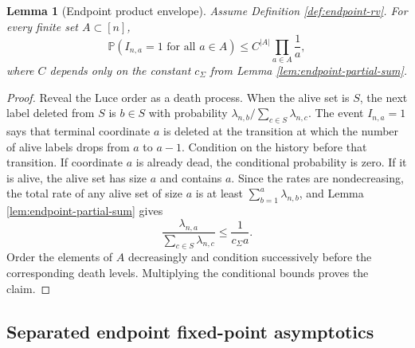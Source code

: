 \documentclass[11pt]{article}
\newtheorem{lemma}[theorem]{Lemma}
\theoremstyle{remark}
\newcommand{\Pp}{\mathbb P}
\begin{document}
\begin{lemma}[Endpoint product envelope]\label{lem:endpoint-rv-product-bound}
Assume Definition \ref{def:endpoint-rv}.  For every finite set
\(A\subset[n]\),
\[
        \Pp(I_{n,a}=1\text{ for all }a\in A)
        \le C^{|A|}\prod_{a\in A}\frac1a,
\]
where $C$ depends only on the constant $c_\Sigma$ from Lemma \ref{lem:endpoint-partial-sum}.
\end{lemma}

\begin{proof}
Reveal the Luce order as a death process.  When the alive set is \(S\), the next
label deleted from \(S\) is \(b\in S\) with probability
\(\lambda_{n,b}/\sum_{c\in S}\lambda_{n,c}\).  The event \(I_{n,a}=1\) says that
terminal coordinate \(a\) is deleted at the transition at which the number of
alive labels drops from \(a\) to \(a-1\).  Condition on the history before that
transition.  If coordinate \(a\) is already dead, the conditional probability is
zero.  If it is alive, the alive set has size \(a\) and contains \(a\).  Since
the rates are nondecreasing, the total rate of any alive set of size \(a\) is at
least $\sum_{b=1}^a\lambda_{n,b}$, and Lemma \ref{lem:endpoint-partial-sum} gives
\[
        \frac{\lambda_{n,a}}{\sum_{c\in S}\lambda_{n,c}}
        \le \frac{1}{c_\Sigma a}.
\]
Order the elements of \(A\) decreasingly and condition successively before the
corresponding death levels.  Multiplying the conditional bounds proves the
claim.
\end{proof}


\subsection{Separated endpoint fixed-point asymptotics}
\label{subsec:endpoint-separated-fixed}
\end{document}
